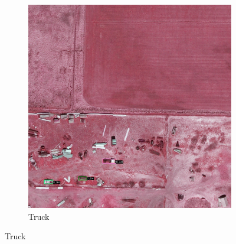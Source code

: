 \begin{figure}[h!]
\begin{subfigure}[t]{0.38\textwidth}
        \includegraphics[width=\linewidth]{images/015Results/02perm_exp/comp_images/irgb/212.png}
        \caption{Truck}
    \end{subfigure}
    

\end{figure}
